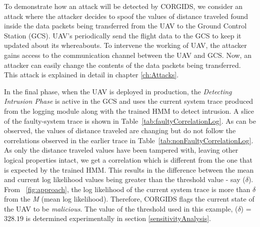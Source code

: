 To demonstrate how an attack will be detected by CORGIDS, we consider an attack where the attacker decides to spoof the values of distance traveled found inside the data packets being transferred from the UAV to the Ground Control Station (GCS). UAV's periodically send the flight data to the GCS to keep it updated about its whereabouts. To intervene the working of UAV, the attacker gains access to the communication channel between the UAV and GCS. Now, an attacker can easily change the contents of the data packets being transferred. This attack is explained in detail in chapter \ref{ch:Attacks}.

In the final phase, when the UAV is deployed in production, the \textit{Detecting Intrusion Phase} is active in the GCS and uses the current system trace produced from the logging module along with the trained HMM to detect intrusion. A slice of the faulty-system trace is shown in Table~\ref{tab:faultyCorrelationLog}. As can be observed, the values of distance traveled are changing but do not follow the correlations observed in the earlier trace in Table~\ref{tab:nonFaultyCorrelationLog}. As only the distance traveled values have been tampered with, leaving other logical properties intact, we get a correlation which is different from the one that is expected by the trained HMM. This results in the difference between the mean and current log likelihood values being greater than the threshold value - say ($\delta$). From ~\autoref{fig:approach}, the log likelihood of the current system trace is more than $\delta$ from the \textit{M} (mean log likelihood). Therefore, CORGIDS flags the current state of the UAV to be \textit{malicious}. The value of the threshold used in this example, ($\delta$) = $328.19$ is determined experimentally in section \ref{sensitivityAnalysis}. 


\endinput
=====================================================================

